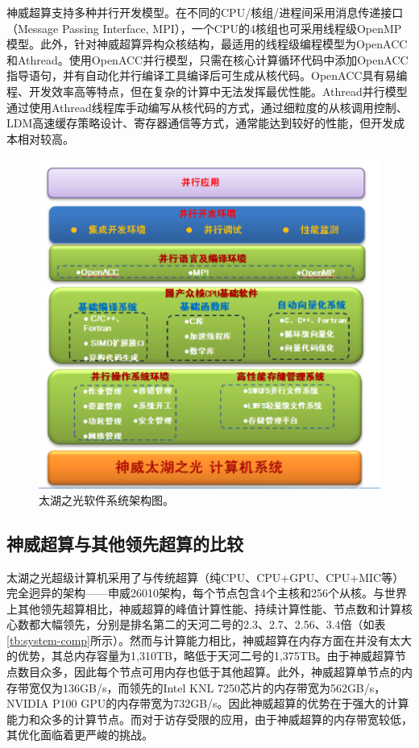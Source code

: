 \documentclass[degree=doctor]{thuthesis}
\begin{document}
神威超算支持多种并行开发模型。在不同的CPU/核组/进程间采用消息传递接口（Message Passing Interface, MPI），一个CPU的4核组也可采用线程级OpenMP模型。此外，针对神威超算异构众核结构，最适用的线程级编程模型为OpenACC和Athread。使用OpenACC并行模型，只需在核心计算循环代码中添加OpenACC指导语句，并有自动化并行编译工具编译后可生成从核代码。OpenACC具有易编程、开发效率高等特点，但在复杂的计算中无法发挥最优性能。Athread并行模型通过使用Athread线程库手动编写从核代码的方式，通过细粒度的从核调用控制、LDM高速缓存策略设计、寄存器通信等方式，通常能达到较好的性能，但开发成本相对较高。

\begin{figure}[ht]
\centering
\includegraphics[width=.8\columnwidth]{sunwaysofts.png}
\caption{太湖之光软件系统架构图。}
\label{fig:sunwaysofts}
\end{figure}

\subsection{神威超算与其他领先超算的比较}

太湖之光超级计算机采用了与传统超算（纯CPU、CPU+GPU、CPU+MIC等）完全迥异的架构——申威26010架构，每个节点包含4个主核和256个从核。与世界上其他领先超算相比，神威超算的峰值计算性能、持续计算性能、节点数和计算核心数都大幅领先，分别是排名第二的天河二号的2.3、2.7、2.56、3.4倍（如表\ref{tb:system-comp}所示）。然而与计算能力相比，神威超算在内存方面在并没有太大的优势，其总内存容量为1,310TB，略低于天河二号的1,375TB。由于神威超算节点数目众多，因此每个节点可用内存也低于其他超算。此外，神威超算单节点的内存带宽仅为136GB/s，而领先的Intel KNL 7250芯片的内存带宽为562GB/s，NVIDIA P100 GPU的内存带宽为732GB/s。因此神威超算的优势在于强大的计算能力和众多的计算节点。而对于访存受限的应用，由于神威超算的内存带宽较低，其优化面临着更严峻的挑战。
\end{document}
